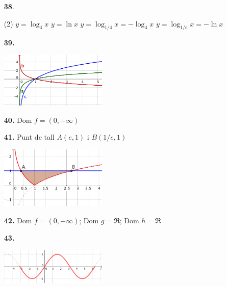 \documentclass[a4paper, pdf, twoside]{book}
\begin{document}
\begin{multicols}{2}
\begin{enumerate}
 \item[\fontfamily{phv}\selectfont\color{blue}\textbf{38}. ] 
 \begin{tasks}[column-sep=1em, item-indent=1.3333em](2)
	 \task $y=\log _4 x$
	 \task $y=\ln x$
	 \task $y=\log _{1/4} x=-\log _4 x$
	 \task $y=\log _{1/e} x=-\ln x$
\end{tasks}
 \end{enumerate}
\begin{enumerate}
\vspace{0.25cm}
\item[\fontfamily{phv}\selectfont\color{blue}\textbf{39. }] 
\mbox {}\par \includegraphics [width=0.4\textwidth ]{img-sol/t5-39}
\vspace{0.25cm}
\item[\fontfamily{phv}\selectfont\color{blue}\textbf{40. }] 
Dom $f=(0,+\infty )$
\vspace{0.25cm}
\item[\fontfamily{phv}\selectfont\color{blue}\textbf{41. }] 
Punt de tall $A(e,1)$ i $B(1/e,1)$ \par \includegraphics [width=0.4\textwidth ]{img-sol/t5-41}
\vspace{0.25cm}
\item[\fontfamily{phv}\selectfont\color{blue}\textbf{42. }] 
Dom $f=(0,+\infty )$; Dom $g=\Re $; Dom $h=\Re $
\vspace{0.25cm}
\item[\fontfamily{phv}\selectfont\color{blue}\textbf{43. }] 
\mbox {}\par \includegraphics [width=0.4\textwidth ]{img-sol/t5-43}
\vspace{0.25cm}

\end{enumerate}
\end{multicols}
\end{document}
